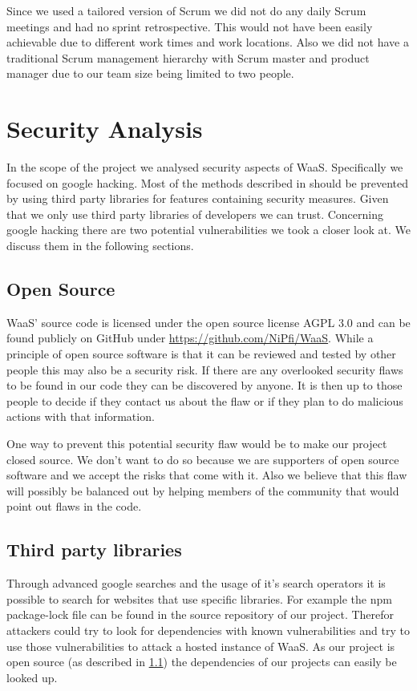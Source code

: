 \documentclass[titlepage, 12pt]{article}
\begin{document}
Since we used a tailored version of Scrum we did not do any daily Scrum meetings and had no sprint retrospective. This would not have been easily achievable due to different work times and work locations. Also we did not have a traditional Scrum management hierarchy with Scrum master and product manager due to our team size being limited to two people.

\section{Security Analysis}

In the scope of the project we analysed security aspects of WaaS. Specifically we focused on google hacking. Most of the methods described in \cite{mJohnnyLong2005} should be prevented by using third party libraries for features containing security measures. Given that we only use third party libraries of developers we can trust. Concerning google hacking there are two potential vulnerabilities we took a closer look at. We discuss them in the following sections.

\subsection{Open Source}
\label{sec:opensource}

WaaS' source code is licensed under the open source license AGPL 3.0 and can be found publicly on GitHub under \url{https://github.com/NiPfi/WaaS}. While a principle of open source software is that it can be reviewed and tested by other people this may also be a security risk. If there are any overlooked security flaws to be found in our code they can be discovered by anyone. It is then up to those people to decide if they contact us about the flaw or if they plan to do malicious actions with that information.


One way to prevent this potential security flaw would be to make our project closed source. We don't want to do so because we are supporters of open source software and we accept the risks that come with it. Also we believe that this flaw will possibly be balanced out by helping members of the community that would point out flaws in the code.


\subsection{Third party libraries}

Through advanced google searches and the usage of it's search operators it is possible to search for websites that use specific libraries. For example the npm package-lock file can be found in the source repository of our project. Therefor attackers could try to look for dependencies with known vulnerabilities and try to use those vulnerabilities to attack a hosted instance of WaaS. As our project is open source (as described in \ref{sec:opensource}) the dependencies of our projects can easily be looked up.
\end{document}
